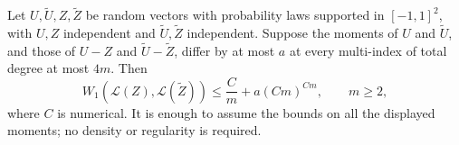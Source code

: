 \begin{lemma}
\label{lem:two-field-moment-separation}
Let $U,\widetilde U,Z,\widetilde Z$ be random vectors with probability
laws supported in $[-1,1]^2$, with $U,Z$ independent and
$\widetilde U,\widetilde Z$ independent.  Suppose the moments of
$U$ and $\widetilde U$, and those of $U-Z$ and
$\widetilde U-\widetilde Z$, differ by at most $a$ at every
multi-index of total degree at most $4m$.  Then
\begin{equation}\label{eq:two-field-moment-stability}
 W_1(\mathcal L(Z),\mathcal L(\widetilde Z))
       \le \frac{C}{m}+a(Cm)^{Cm},\qquad m\ge2,
\end{equation}
where $C$ is numerical.  It is enough to assume the bounds on all
the displayed moments; no density or regularity is required.
\end{lemma}

